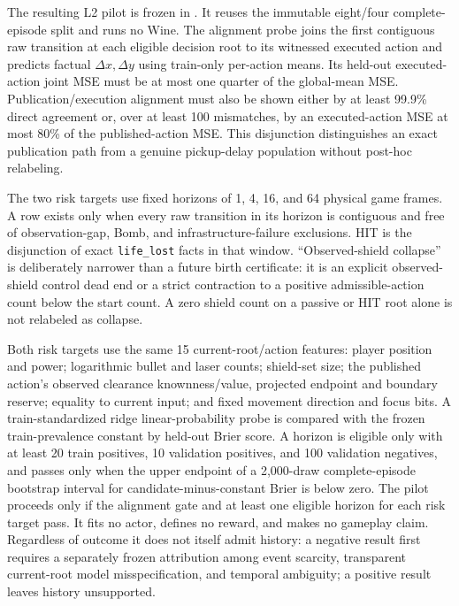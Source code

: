 \documentclass[11pt]{article}
\begin{document}
The resulting L2 pilot is frozen in
.  It reuses the immutable
eight/four complete-episode split and runs no Wine.  The alignment probe joins
the first contiguous raw transition at each eligible decision root to its
witnessed executed action and predicts factual $\Delta x,\Delta y$ using
train-only per-action means.  Its held-out executed-action joint MSE must be at
most one quarter of the global-mean MSE.  Publication/execution alignment must
also be shown either by at least 99.9\% direct agreement or, over at least 100
mismatches, by an executed-action MSE at most 80\% of the published-action
MSE.  This disjunction distinguishes an exact publication path from a genuine
pickup-delay population without post-hoc relabeling.

The two risk targets use fixed horizons of 1, 4, 16, and 64 physical game
frames.  A row exists only when every raw transition in its horizon is
contiguous and free of observation-gap, Bomb, and infrastructure-failure
exclusions.  HIT is the disjunction of exact \texttt{life\_lost} facts in that
window.  ``Observed-shield collapse'' is deliberately narrower than a future
birth certificate: it is an explicit observed-shield control dead end or a
strict contraction to a positive admissible-action count below the start
count.  A zero shield count on a passive or HIT root alone is not relabeled as
collapse.

Both risk targets use the same 15 current-root/action features: player
position and power; logarithmic bullet and laser counts; shield-set size; the
published action's observed clearance knownness/value, projected endpoint and
boundary reserve; equality to current input; and fixed movement direction and
focus bits.  A train-standardized ridge linear-probability probe is compared
with the frozen train-prevalence constant by held-out Brier score.  A horizon
is eligible only with at least 20 train positives, 10 validation positives,
and 100 validation negatives, and passes only when the upper endpoint of a
2,000-draw complete-episode bootstrap interval for candidate-minus-constant
Brier is below zero.  The pilot proceeds only if the alignment gate and at
least one eligible horizon for each risk target pass.  It fits no actor,
defines no reward, and makes no gameplay claim.  Regardless of outcome it does
not itself admit history: a negative result first requires a separately frozen
attribution among event scarcity, transparent current-root model
misspecification, and temporal ambiguity; a positive result leaves history
unsupported.
\end{document}
